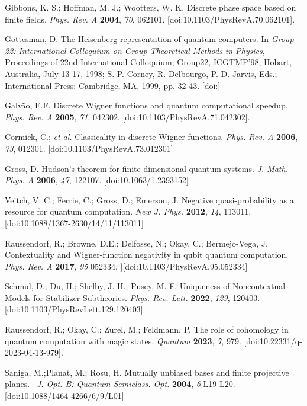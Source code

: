 \documentclass{article}
\begin{document}
\begin{thebibliography}{99}
 Gibbons, K. S.; Hoffman, M. J.; Wootters, W. K. Discrete
phase space based on finite fields. \textit{Phys. Rev. A} \textbf{2004}, 
\textit{70}, 062101. [doi:10.1103/PhysRevA.70.062101].

 Gottesman, D. The Heisenberg representation of quantum
computers. In \textit{Group 22: International Colloquium on Group
Theoretical Methods in Physics}, Proceedings of 22nd International
Colloquium, Group22, ICGTMP'98, Hobart, Australia, July 13-17, 1998; S. P.
Corney, R. Delbourgo, P. D. Jarvis, Eds.; International Press: Cambridge,
MA, 1999, pp. 32-43. [doi:]

 Galv\~ao, E.F. Discrete Wigner functions and quantum
computational speedup. \textit{Phys. Rev. A} \textbf{2005}, \textit{71},
042302. [doi:10.1103/PhysRevA.71.042302].

 Cormick, C.; \textit{et al.} Classicality in discrete
Wigner functions. \textit{Phys. Rev. A} \textbf{2006}, \textit{73}, 012301.
[doi:10.1103/PhysRevA.73.012301]

 Gross, D. Hudson's theorem for
finite-dimensional quantum systems. \textit{J. Math. Phys. A} \textbf{2006}, 
\textit{47}, 122107. [doi:10.1063/1.2393152]

 Veitch, V. C.; Ferrie, C.; Gross, D.; Emerson,
J. Negative quasi-probability as a resource for quantum computation. \textit{New
J. Phys.} \textbf{2012}, \textit{14}, 113011.
[doi:10.1088/1367-2630/14/11/113011]

 Raussendorf, R.; Browne, D.E.; Delfosse, N.; Okay, C.;
Bermejo-Vega, J. Contextuality and Wigner-function negativity in qubit
quantum computation. \textit{Phys. Rev. A} \textbf{2017}, \textit{95}
052334. ][doi:10.1103/PhysRevA.95.052334]

 Schmid, D.; Du, H.; Shelby, J. H.; Pusey, M. F.
Uniqueness of Noncontextual Models for Stabilizer Subtheories. \textit{Phys.
Rev. Lett.} \textbf{2022}, \textit{129}, 120403.
[doi:10.1103/PhysRevLett.129.120403]

 Raussendorf, R.; Okay, C.; Zurel, M.; Feldmann, P. The role
of cohomology in quantum computation with magic states. \textit{Quantum} 
\textbf{2023}, \textit{7}, 979. [doi:10.22331/q-2023-04-13-979].

 Saniga, M.;Planat, M.; Rosu, H. Mutually unbiased bases
and finite projective planes. \textit{\ J. Opt. B: Quantum Semiclass. Opt.} 
\textbf{2004}, \textit{6} L19-L20. [doi:10.1088/1464-4266/6/9/L01]


\end{thebibliography}
\end{document}
